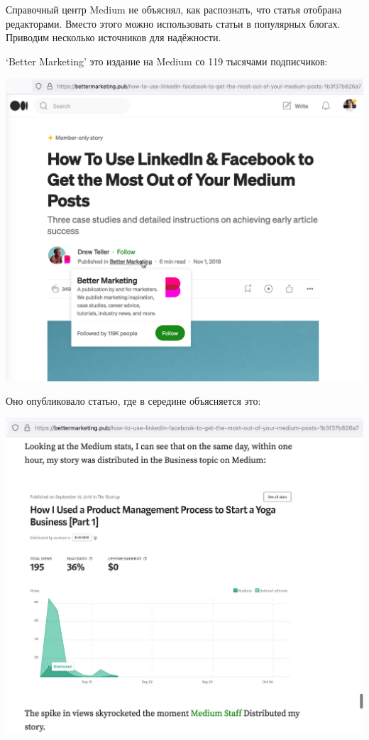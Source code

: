 
Справочный центр Medium не объяснял, как распознать, что статья отобрана редакторами.
Вместо этого можно использовать статьи в популярных блогах.
Приводим несколько источников для надёжности.

`Better Marketing' это издание на Medium со 119 тысячами подписчиков:

\begin{center}
    \includegraphics[width=\textwidth]{bettermarketing-top}
\end{center}

Оно опубликовало статью, где в середине объясняется это:

\begin{center}
    \includegraphics[width=\textwidth]{bettermarketing-content}
\end{center}
\pagebreak


